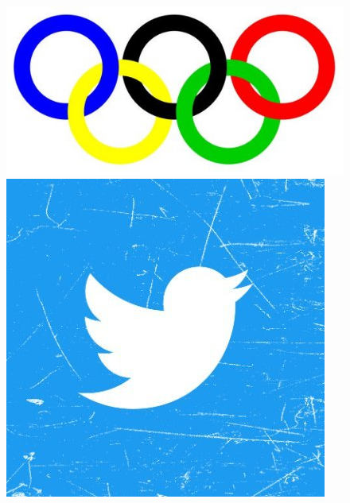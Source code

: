 \documentclass[12pt]{article}
\begin{document}
            \begin{figure}[htp]
                \centering
                \includegraphics[scale=0.4]{Rings2.jpg}
                \hspace{0.25in}
                \includegraphics[scale=0.4]{Twitter.jpg}
            \end{figure}
\end{document}
